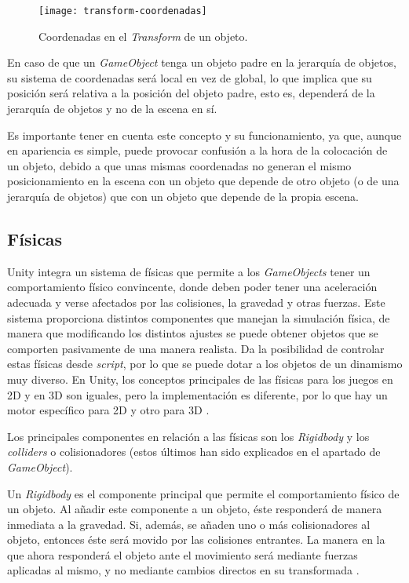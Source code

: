 \begin{figure}[h]
	\centering
	\texttt{[image: transform-coordenadas]}
	\caption{Coordenadas en el \textit{Transform} de un objeto.}
	\label{fig:transform-coordenadas}
\end{figure}

En caso de que un \textit{GameObject} tenga un objeto padre en la jerarquía de objetos, su sistema de coordenadas será local en vez de global, lo que implica que su posición será relativa a la posición del objeto padre, esto es, dependerá de la jerarquía de objetos y no de la escena en sí.

Es importante tener en cuenta este concepto y su funcionamiento, ya que, aunque en apariencia es simple, puede provocar confusión a la hora de la colocación de un objeto, debido a que unas mismas coordenadas no generan el mismo posicionamiento en la escena con un objeto que depende de otro objeto (o de una jerarquía de objetos) que con un objeto que depende de la propia escena.

\subsection{Físicas}

Unity integra un sistema de físicas que permite a los \textit{GameObjects} tener un comportamiento físico convincente, donde deben poder tener una aceleración adecuada y verse afectados por las colisiones, la gravedad y otras fuerzas. Este sistema proporciona distintos componentes que manejan la simulación física, de manera que modificando los distintos ajustes se puede obtener objetos que se comporten pasivamente de una manera realista. Da la posibilidad de controlar estas físicas desde \textit{script}, por lo que se puede dotar a los objetos de un dinamismo muy diverso. En Unity, los conceptos principales de las físicas para los juegos en 2D y en 3D son iguales, pero la implementación es diferente, por lo que hay un motor específico para 2D y otro para 3D \cite{doc:physics}.

Los principales componentes en relación a las físicas son los \textit{Rigidbody} y los \textit{colliders} o colisionadores (estos últimos han sido explicados en el apartado de \textit{GameObject}). 

Un \textit{Rigidbody} es el componente principal que permite el comportamiento físico de un objeto. Al añadir este componente a un objeto, éste responderá de manera inmediata a la gravedad. Si, además, se añaden uno o más colisionadores al objeto, entonces éste será movido por las colisiones entrantes. La manera en la que ahora responderá el objeto ante el movimiento será mediante fuerzas aplicadas al mismo, y no mediante cambios directos en su transformada \cite{doc:rigidbody}.


